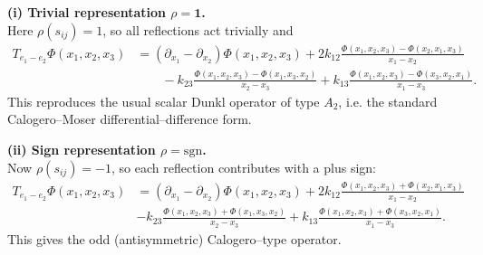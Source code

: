 \documentclass[12pt]{article}
\newcommand{\1}{\mathbbm{1}}
\theoremstyle{definition}
\begin{document}
\medskip

\noindent\textbf{(i) Trivial representation \(\rho=\mathbf{1}\).}\\[2pt]
Here $\rho(s_{ij})=1$, so all reflections act trivially and
\begin{align}
T_{e_1-e_2}\Phi(x_1,x_2,x_3)
&= (\partial_{x_1}-\partial_{x_2})\Phi(x_1,x_2,x_3)+ 2k_{12}\frac{\Phi(x_1,x_2,x_3)-\Phi(x_2,x_1,x_3)}{x_1-x_2} \nonumber \\
&\quad \quad  - k_{23}\frac{\Phi(x_1,x_2,x_3)-\Phi(x_1,x_3,x_2)}{x_2-x_3}+ k_{13}\frac{\Phi(x_1,x_2,x_3)-\Phi(x_3,x_2,x_1)}{x_1-x_3}.
\end{align}
This reproduces the usual scalar Dunkl operator of type $A_2$, i.e.
the standard Calogero--Moser differential--difference form.


\noindent\textbf{(ii) Sign representation \(\rho=\mathrm{sgn}\).}\\[2pt]
Now $\rho(s_{ij})=-1$, so each reflection contributes with a plus sign:
\begin{align}
T_{e_1-e_2}\Phi(x_1,x_2,x_3)
&= (\partial_{x_1}-\partial_{x_2})\Phi(x_1,x_2,x_3)
+ 2k_{12}\frac{\Phi(x_1,x_2,x_3)+\Phi(x_2,x_1,x_3)}{x_1-x_2} \nonumber\\
&- k_{23}\frac{\Phi(x_1,x_2,x_3)+\Phi(x_1,x_3,x_2)}{x_2-x_3}
+ k_{13}\frac{\Phi(x_1,x_2,x_3)+\Phi(x_3,x_2,x_1)}{x_1-x_3}.
\end{align}
This gives the odd (antisymmetric) Calogero--type operator.

\medskip
\end{document}
